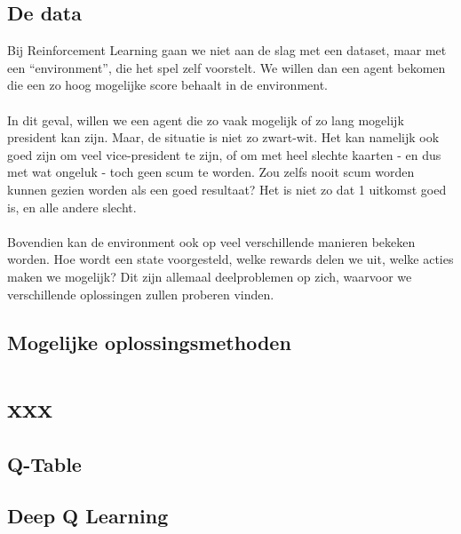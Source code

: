 \documentclass[11pt]{article}
\begin{document}
\subsection{De data}
Bij Reinforcement Learning gaan we niet aan de slag met een dataset, maar met een “environment”, die het spel zelf voorstelt. We willen dan een agent bekomen die een zo hoog mogelijke score behaalt in de environment. \\\\ In dit geval, willen we een agent die zo vaak mogelijk of zo lang mogelijk president kan zijn. Maar, de situatie is niet zo zwart-wit. Het kan namelijk ook goed zijn om veel vice-president te zijn, of om met heel slechte kaarten - en dus met wat ongeluk - toch geen scum te worden. Zou zelfs nooit scum worden kunnen gezien worden als een goed resultaat?  Het is niet zo dat 1 uitkomst goed is, en alle andere slecht. \\\\ Bovendien kan de environment ook op veel verschillende manieren bekeken worden. Hoe wordt een state voorgesteld, welke rewards delen we uit, welke acties maken we mogelijk? Dit zijn allemaal deelproblemen op zich, waarvoor we verschillende oplossingen zullen proberen vinden.
\subsection{Mogelijke oplossingsmethoden}
\section{xxx}
\subsection{Q-Table}
\subsection{Deep Q Learning}
\end{document}
